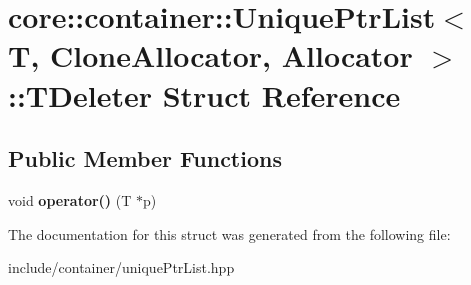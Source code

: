 \hypertarget{structcore_1_1container_1_1_unique_ptr_list_1_1_t_deleter}{\section{core\-:\-:container\-:\-:Unique\-Ptr\-List$<$ T, Clone\-Allocator, Allocator $>$\-:\-:T\-Deleter Struct Reference}
\label{structcore_1_1container_1_1_unique_ptr_list_1_1_t_deleter}
}
\subsection*{Public Member Functions}
\begin{DoxyCompactItemize}
\item 
\hypertarget{structcore_1_1container_1_1_unique_ptr_list_1_1_t_deleter_aa390a6508968bb0c8ca556668cbb683c}{void {\bfseries operator()} (T $\ast$p)}\label{structcore_1_1container_1_1_unique_ptr_list_1_1_t_deleter_aa390a6508968bb0c8ca556668cbb683c}

\end{DoxyCompactItemize}


The documentation for this struct was generated from the following file\-:\begin{DoxyCompactItemize}
\item 
include/container/unique\-Ptr\-List.\-hpp\end{DoxyCompactItemize}
